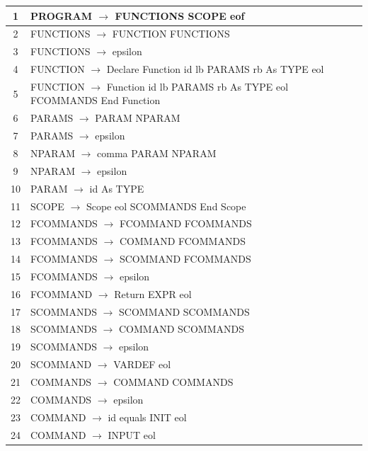 \documentclass[11pt, a4paper]{article}
\begin{document}
\begin{center}
    \begin{tabular}{ c | l }
        1 & PROGRAM     $\rightarrow$ FUNCTIONS SCOPE eof \\ \hline
        2 & FUNCTIONS   $\rightarrow$ FUNCTION FUNCTIONS \\ \hline
        3 & FUNCTIONS   $\rightarrow$ epsilon \\ \hline
        4 & FUNCTION    $\rightarrow$ Declare Function id lb PARAMS rb As TYPE eol \\ \hline
        5 & FUNCTION    $\rightarrow$ Function id lb PARAMS rb As TYPE eol FCOMMANDS End Function \\ \hline
        6 & PARAMS      $\rightarrow$  PARAM NPARAM \\ \hline
        7 & PARAMS      $\rightarrow$  epsilon  \\ \hline
        8 & NPARAM      $\rightarrow$ comma PARAM NPARAM \\ \hline
        9 & NPARAM      $\rightarrow$ epsilon \\ \hline
        10 & PARAM       $\rightarrow$ id As TYPE \\ \hline
        11 & SCOPE       $\rightarrow$ Scope eol SCOMMANDS End Scope \\ \hline
        12 & FCOMMANDS   $\rightarrow$ FCOMMAND FCOMMANDS \\ \hline
        13 & FCOMMANDS   $\rightarrow$ COMMAND FCOMMANDS \\ \hline
        14 & FCOMMANDS   $\rightarrow$ SCOMMAND FCOMMANDS \\ \hline
        15 & FCOMMANDS   $\rightarrow$ epsilon \\ \hline
        16 & FCOMMAND    $\rightarrow$ Return EXPR eol \\ \hline
        17 & SCOMMANDS   $\rightarrow$ SCOMMAND SCOMMANDS \\ \hline
        18 & SCOMMANDS   $\rightarrow$ COMMAND SCOMMANDS \\ \hline
        19 & SCOMMANDS   $\rightarrow$ epsilon \\ \hline
        20 & SCOMMAND    $\rightarrow$ VARDEF eol \\ \hline
        21 & COMMANDS    $\rightarrow$ COMMAND COMMANDS \\ \hline
        22 & COMMANDS    $\rightarrow$ epsilon \\ \hline
        23 & COMMAND     $\rightarrow$ id equals INIT eol \\ \hline
        24 & COMMAND     $\rightarrow$ INPUT eol \\ \hline

\end{tabular}
\end{center}
\end{document}

